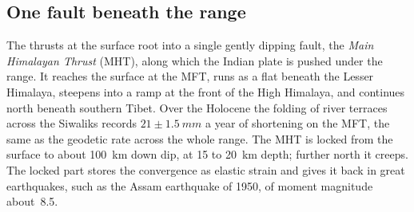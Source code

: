 \subsection{One fault beneath the range}

The thrusts at the surface root into a single gently dipping fault, the \emph{Main
Himalayan Thrust} (MHT), along which the Indian plate is pushed under the range. It reaches
the surface at the MFT, runs as a flat beneath the Lesser Himalaya, steepens into a ramp at
the front of the High Himalaya, and continues north beneath southern Tibet. Over the Holocene
the folding of river terraces across the Siwaliks records $21 \pm \qty{1.5}{mm}$ a year of
shortening on the MFT, the same as the geodetic rate across the whole range. The MHT is
locked from the surface to about \qty{100}{km} down dip, at 15 to \qty{20}{km} depth; further
north it creeps. The locked part stores the convergence as elastic strain and gives it back
in great earthquakes, such as the Assam earthquake of 1950, of moment magnitude about~8.5.

